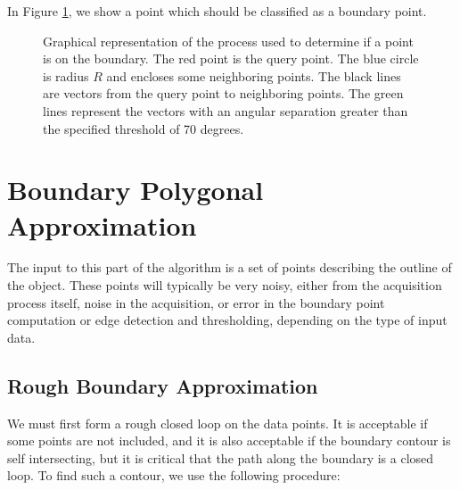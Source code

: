 \documentclass{InsightArticle}
\begin{document}
In Figure \ref{fig:BoundaryDetermination}, we show a point which should be classified as a boundary point.

\begin{figure}[H]
\centering
{}
\caption{Graphical representation of the process used to determine if a point is on the boundary. The red point is the query point. The blue circle is radius $R$ and encloses some neighboring points. The black lines are vectors from the query point to neighboring points. The green lines represent the vectors with an angular separation greater than the specified threshold of 70 degrees.}
\label{fig:BoundaryDetermination}
\end{figure}

\section{Boundary Polygonal Approximation}
\label{sec:PolygonalApproximation}
The input to this part of the algorithm is a set of points describing the outline of the object. These points will typically be very noisy, either from the acquisition process itself, noise in the acquisition, or error in the boundary point computation or edge detection and thresholding, depending on the type of input data.

\subsection{Rough Boundary Approximation}
We must first form a rough closed loop on the data points. It is acceptable if some points are not included, and it is also acceptable if the boundary contour is self intersecting, but it is critical that the path along the boundary is a closed loop. To find such a contour, we use the following procedure:
\end{document}
